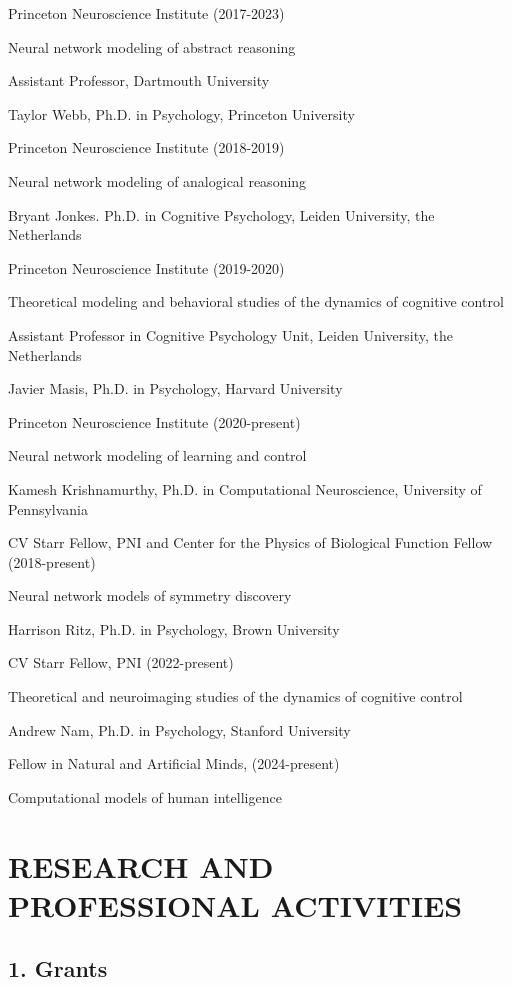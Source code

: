 \documentclass[10 pt]{article}
\begin{document}
Princeton Neuroscience Institute (2017-2023)

Neural network modeling of abstract reasoning

Assistant Professor, Dartmouth University
    \medskip

Taylor Webb, Ph.D. in Psychology, Princeton University

Princeton Neuroscience Institute (2018-2019)

Neural network modeling of analogical reasoning
    \medskip

Bryant Jonkes. Ph.D. in Cognitive Psychology, Leiden University, the Netherlands

Princeton Neuroscience Institute (2019-2020)

Theoretical modeling and behavioral studies of the dynamics of cognitive control

Assistant Professor in Cognitive Psychology Unit, Leiden University, the Netherlands
    \medskip


Javier Masis, Ph.D. in Psychology, Harvard University

Princeton Neuroscience Institute (2020-present)


Neural network modeling of learning and control
    \medskip

Kamesh Krishnamurthy, Ph.D. in Computational Neuroscience, University of Pennsylvania

CV Starr Fellow, PNI and Center for the Physics of Biological Function Fellow (2018-present)

Neural network models of symmetry discovery
    \medskip

Harrison Ritz, Ph.D. in Psychology, Brown University

CV Starr Fellow, PNI (2022-present)

Theoretical and neuroimaging studies of the dynamics of cognitive control
    \medskip

Andrew Nam, Ph.D. in Psychology, Stanford University

Fellow in Natural and Artificial Minds, (2024-present)

Computational models of human intelligence
    \medskip


\section*{RESEARCH AND PROFESSIONAL ACTIVITIES} \label{secRAPA}

\subsection*{1. Grants} \label{secRAPA1}
\end{document}
